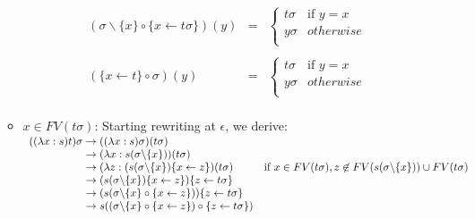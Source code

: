 \documentclass[a4paper]{article}
\newcommand{\fpsubstin}[1]{\{#1\}}
\newcommand{\fpscat}[0]{\circ}
\newcommand{\fpwith}{\leftarrow}
\newcommand{\fpwithoutset}[1]{\backslash\{#1\}}
\newcommand{\rewrites}[0]{\;\rightarrow\;}
\theoremstyle{definition}
\begin{document}
\begin{itemize}
\begin{itemize}
    \[
      \begin{array}{lcl}
        (\sigma\fpwithoutset{x} \fpscat \fpsubstin{x \fpwith t\sigma})(y)
        & = &
              \left\{
              \begin{array}{ll}
                t\sigma&\mbox{if }y=x\\
                y\sigma& otherwise\\
              \end{array}
        \right.
        \\\\
        (\fpsubstin{x \fpwith t} \fpscat \sigma) (y) &=&
                                                         \left\{
                                                         \begin{array}{ll}
                                                           t \sigma&\mbox{if }y=x\\
                                                           y \sigma & otherwise\\
                                                         \end{array}
        \right.\\
      \end{array}
    \]

  \item $x \in FV(t\sigma)$: Starting rewriting at $\epsilon$, we derive:\\
    $
    \begin{array}{r@{\rewrites}ll}
      ((\lambda x:s)t)\sigma & ((\lambda x:s)\sigma)(t\sigma) & \\
                             & (\lambda x : s(\sigma\fpwithoutset{x}))
                               (t\sigma) & \\
                             &  (\lambda z : (s(\sigma\fpwithoutset{x})
                               \fpsubstin{x \fpwith z} )(t\sigma)
                                                              & \mbox{if }x \in FV(t\sigma),
                                                                z \not \in FV(s(\sigma\fpwithoutset{x}))  \cup FV(t\sigma)\\
                             & (s(\sigma\fpwithoutset{x})
                               \fpsubstin{x \fpwith z} )\fpsubstin{z
                               \fpwith t\sigma} \\
                             & (s(\sigma\fpwithoutset{x} \fpscat
                               \fpsubstin{x \fpwith z} ))\fpsubstin{z
                               \fpwith t\sigma} \\
                             & s((\sigma\fpwithoutset{x} \fpscat
                               \fpsubstin{x \fpwith z}) \fpscat
                               \fpsubstin{z \fpwith t\sigma} ) \\
    \end{array}
    $


\end{itemize}
\end{itemize}
\end{document}
